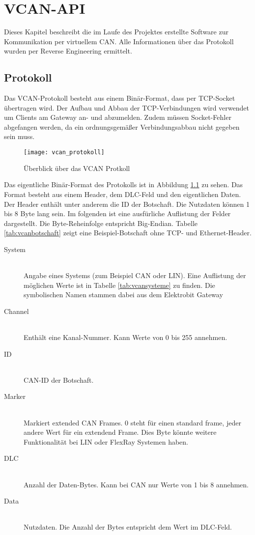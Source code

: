 \chapter{VCAN-API}
\label{sec:vcan_api}
Dieses Kapitel beschreibt die im Laufe des Projektes erstellte Software zur Kommunikation per virtuellem CAN. Alle Informationen über das Protokoll wurden per Reverse Engineering ermittelt.


\section{Protokoll}
\label{sec:vcan_protokoll}
Das VCAN-Protokoll besteht aus einem Binär-Format, dass per TCP-Socket übertragen wird. Der Aufbau und Abbau der TCP-Verbindungen wird verwendet um Clients am Gateway an- und abzumelden. Zudem müssen Socket-Fehler abgefangen werden, da ein ordnungsgemäßer Verbindungsabbau nicht gegeben sein muss.

\begin{figure}[ht]
\centering
\texttt{[image: vcan\_protokoll]}
\caption{Überblick über das VCAN Protkoll}
\label{fig:vcan_protokoll}
\end{figure}

Das eigentliche Binär-Format des Protokolls ist in Abbildung \ref{fig:vcan_protokoll} zu sehen. Das Format besteht aus einem Header, dem DLC-Feld und den eigentlichen Daten. Der Header enthält unter anderem die ID der Botschaft. Die Nutzdaten können 1 bis 8 Byte lang sein. Im folgenden ist eine ausfürliche Auflistung der Felder dargestellt. Die Byte-Reheinfolge entspricht Big-Endian. Tabelle \ref{tab:vcanbotschaft} zeigt eine Beispiel-Botschaft ohne TCP- und Ethernet-Header.

\begin{description}
    \item[System] \hfill \\ Angabe eines Systems (zum Beispiel CAN oder LIN). Eine Auflistung der möglichen Werte ist in Tabelle \ref{tab:vcansysteme} zu finden. Die symbolischen Namen stammen dabei aus dem Elektrobit Gateway
    \item[Channel] \hfill \\ Enthält eine Kanal-Nummer. Kann Werte von 0 bis 255 annehmen.
    \item[ID] \hfill \\ CAN-ID der Botschaft.
    \item[Marker] \hfill \\ Markiert extended CAN Frames. 0 steht für einen standard frame, jeder andere Wert für ein extendend Frame. Dies Byte könnte weitere Funktionalität bei LIN oder FlexRay Systemen haben.
    \item[DLC] \hfill \\ Anzahl der Daten-Bytes. Kann bei CAN nur Werte von 1 bis 8 annehmen. 
    \item[Data] \hfill \\ Nutzdaten. Die Anzahl der Bytes entspricht dem Wert im DLC-Feld.
\end{description}

